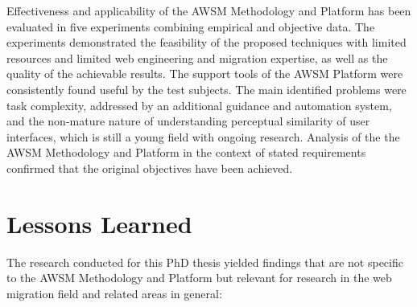 Effectiveness and applicability of the AWSM Methodology and Platform has been evaluated in five experiments combining empirical and objective data.
The experiments demonstrated the feasibility of the proposed techniques with limited resources and limited web engineering and migration expertise, as well as the quality of the achievable results.
The support tools of the AWSM Platform were consistently found useful by the test subjects.
The main identified problems were task complexity, addressed by an additional guidance and automation system, and the non-mature nature of understanding perceptual similarity of user interfaces, which is still a young field with ongoing research.
Analysis of the the AWSM Methodology and Platform in the context of stated requirements confirmed that the original objectives have been achieved.

\hypertarget{lessons-learned}{%
\section{Lessons Learned}\label{lessons-learned}}

The research conducted for this PhD thesis yielded findings that are not specific to the AWSM Methodology and Platform but relevant for research in the web migration field and related areas in general:

